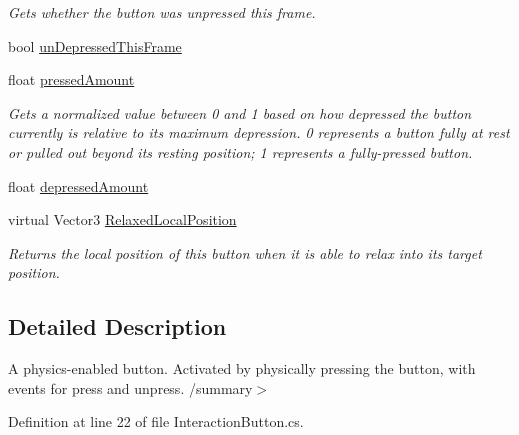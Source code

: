 \begin{DoxyCompactItemize}
\begin{DoxyCompactList}\small\item\em Gets whether the button was unpressed this frame. \end{DoxyCompactList}\item 
bool \mbox{\hyperlink{class_leap_1_1_unity_1_1_interaction_1_1_interaction_button_a9d4ab83c7b2254a5f2be3bfa527bffbb}{un\+Depressed\+This\+Frame}}
\item 
float \mbox{\hyperlink{class_leap_1_1_unity_1_1_interaction_1_1_interaction_button_afb700dd401edd1be364b9a0a3262a6c9}{pressed\+Amount}}
\begin{DoxyCompactList}\small\item\em Gets a normalized value between 0 and 1 based on how depressed the button currently is relative to its maximum depression. 0 represents a button fully at rest or pulled out beyond its resting position; 1 represents a fully-\/pressed button. \end{DoxyCompactList}\item 
float \mbox{\hyperlink{class_leap_1_1_unity_1_1_interaction_1_1_interaction_button_a8836fb5e5744ec7c30f475fc2a4666e1}{depressed\+Amount}}
\item 
virtual Vector3 \mbox{\hyperlink{class_leap_1_1_unity_1_1_interaction_1_1_interaction_button_a31ea002ad202e24eeedc6291f3e6fd8e}{Relaxed\+Local\+Position}}
\begin{DoxyCompactList}\small\item\em Returns the local position of this button when it is able to relax into its target position. \end{DoxyCompactList}\end{DoxyCompactItemize}


\subsection{Detailed Description}
A physics-\/enabled button. Activated by physically pressing the button, with events for press and unpress. /summary$>$ 

Definition at line 22 of file Interaction\+Button.\+cs.



